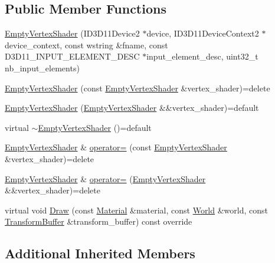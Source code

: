 \subsection*{Public Member Functions}
\begin{DoxyCompactItemize}
\item 
\hyperlink{classmage_1_1_empty_vertex_shader_a28fae401cf46242513144278dcd7f051}{Empty\+Vertex\+Shader} (I\+D3\+D11\+Device2 $\ast$device, I\+D3\+D11\+Device\+Context2 $\ast$device\+\_\+context, const wstring \&fname, const D3\+D11\+\_\+\+I\+N\+P\+U\+T\+\_\+\+E\+L\+E\+M\+E\+N\+T\+\_\+\+D\+E\+SC $\ast$input\+\_\+element\+\_\+desc, uint32\+\_\+t nb\+\_\+input\+\_\+elements)
\item 
\hyperlink{classmage_1_1_empty_vertex_shader_a6ab1b22d108fde8f8876e6a2e4c0decb}{Empty\+Vertex\+Shader} (const \hyperlink{classmage_1_1_empty_vertex_shader}{Empty\+Vertex\+Shader} \&vertex\+\_\+shader)=delete
\item 
\hyperlink{classmage_1_1_empty_vertex_shader_a04d905fda6f77338521746fee50e6bf7}{Empty\+Vertex\+Shader} (\hyperlink{classmage_1_1_empty_vertex_shader}{Empty\+Vertex\+Shader} \&\&vertex\+\_\+shader)=default
\item 
virtual \hyperlink{classmage_1_1_empty_vertex_shader_a321ef00a2087030b81713e989ab02306}{$\sim$\+Empty\+Vertex\+Shader} ()=default
\item 
\hyperlink{classmage_1_1_empty_vertex_shader}{Empty\+Vertex\+Shader} \& \hyperlink{classmage_1_1_empty_vertex_shader_a2683d29127405d51737008637ebde098}{operator=} (const \hyperlink{classmage_1_1_empty_vertex_shader}{Empty\+Vertex\+Shader} \&vertex\+\_\+shader)=delete
\item 
\hyperlink{classmage_1_1_empty_vertex_shader}{Empty\+Vertex\+Shader} \& \hyperlink{classmage_1_1_empty_vertex_shader_a449401b726fc5cd30012a3d8df2e0832}{operator=} (\hyperlink{classmage_1_1_empty_vertex_shader}{Empty\+Vertex\+Shader} \&\&vertex\+\_\+shader)=delete
\item 
virtual void \hyperlink{classmage_1_1_empty_vertex_shader_aaecd66ff2aa90221accbde8e5bf1f239}{Draw} (const \hyperlink{structmage_1_1_material}{Material} \&material, const \hyperlink{classmage_1_1_world}{World} \&world, const \hyperlink{structmage_1_1_transform_buffer}{Transform\+Buffer} \&transform\+\_\+buffer) const override
\end{DoxyCompactItemize}
\subsection*{Additional Inherited Members}


